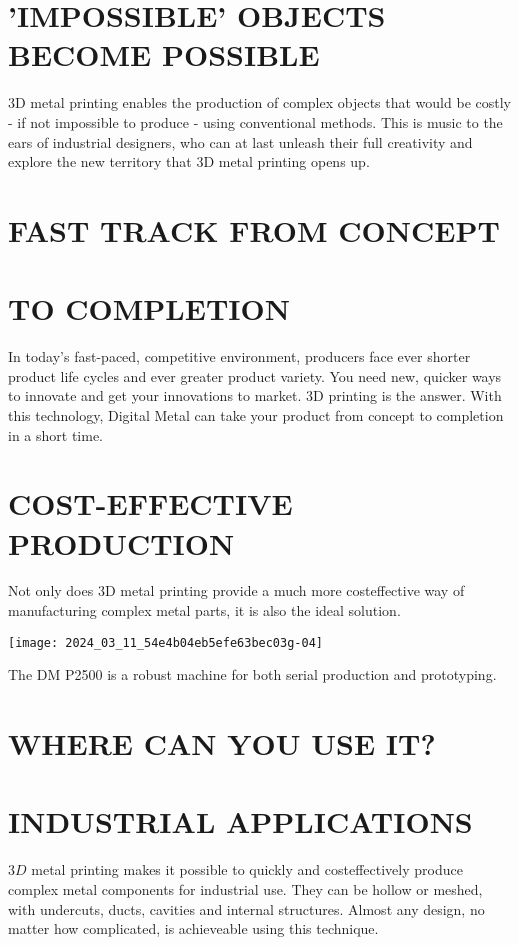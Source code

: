 \documentclass[10pt]{article}
\begin{document}
\section*{'IMPOSSIBLE' OBJECTS BECOME POSSIBLE}
$3 \mathrm{D}$ metal printing enables the production of complex objects that would be costly - if not impossible to produce - using conventional methods. This is music to the ears of industrial designers, who can at last unleash their full creativity and explore the new territory that 3D metal printing opens up.

\section*{FAST TRACK FROM CONCEPT}
\section*{TO COMPLETION}
In today's fast-paced, competitive environment, producers face ever shorter product life cycles and ever greater product variety. You need new, quicker ways to innovate and get your innovations to market. 3D printing is the answer. With this technology, Digital Metal can take your product from concept to completion in a short time.

\section*{COST-EFFECTIVE PRODUCTION}
Not only does 3D metal printing provide a much more costeffective way of manufacturing complex metal parts, it is also the ideal solution.

\begin{center}
\texttt{[image: 2024\_03\_11\_54e4b04eb5efe63bec03g-04]}
\end{center}

The DM P2500 is a robust machine for both serial production and prototyping.

\section*{WHERE CAN YOU USE IT?}
\section*{INDUSTRIAL APPLICATIONS}
$3 D$ metal printing makes it possible to quickly and costeffectively produce complex metal components for industrial use. They can be hollow or meshed, with undercuts, ducts, cavities and internal structures. Almost any design, no matter how complicated, is achieveable using this technique.
\end{document}
